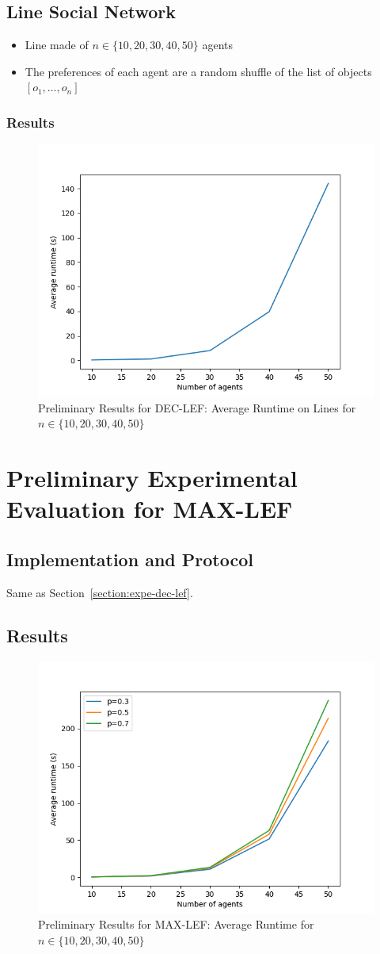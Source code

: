 \documentclass{article}
\begin{document}
\subsection{Line Social Network}
\begin{itemize}
	\item Line made of $n \in \{10, 20, 30, 40, 50\}$ agents
	\item The preferences of each agent are a random shuffle of the list of objects $[o_1,\dots,o_n]$
\end{itemize}

\subsubsection{Results}
\begin{figure}[htb]
\centering
\includegraphics[width=0.5\linewidth]{prelim-line-results.png}
\caption{Preliminary Results for DEC-LEF: Average Runtime on Lines for $n \in \{10,20,30,40,50\}$}
\end{figure}

\section{Preliminary Experimental Evaluation for MAX-LEF}
\subsection{Implementation and Protocol}
Same as Section~\ref{section:expe-dec-lef}.

\subsection{Results}
\begin{figure}[htb]
\centering
\includegraphics[width=0.5\linewidth]{prelim-results-optim.png}
\caption{Preliminary Results for MAX-LEF: Average Runtime for $n \in \{10,20,30,40,50\}$}
\end{figure}

  
 
\end{document}
